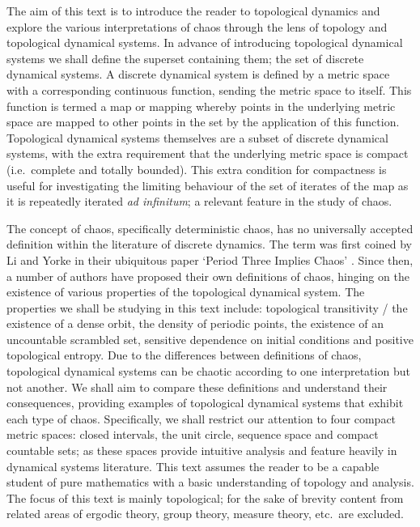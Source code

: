 The aim of this text is to introduce the reader to topological dynamics and explore the various interpretations of chaos through the lens of topology and topological dynamical systems. In advance of introducing topological dynamical systems we shall define the superset containing them; the set of discrete dynamical systems. A discrete dynamical system is defined by a metric space with a corresponding continuous function, sending the metric space to itself. This function is termed a map or mapping whereby points in the underlying metric space are mapped to other points in the set by the application of this function. Topological dynamical systems themselves are a subset of discrete dynamical systems, with the extra requirement that the underlying metric space is compact (i.e.\ complete and totally bounded). This extra condition for compactness is useful for investigating the limiting behaviour of the set of iterates of the map as it is repeatedly iterated \emph{ad infinitum}; a relevant feature in the study of chaos.

The concept of chaos, specifically deterministic chaos, has no universally accepted definition within the literature of discrete dynamics. The term was first coined by Li and Yorke in their ubiquitous paper `Period Three Implies Chaos' \cite{li-yorke}. Since then, a number of authors have proposed their own definitions of chaos, hinging on the existence of various properties of the topological dynamical system. The properties we shall be studying in this text include: topological transitivity / the existence of a dense orbit, the density of periodic points, the existence of an uncountable scrambled set, sensitive dependence on initial conditions and positive topological entropy. Due to the differences between definitions of chaos, topological dynamical systems can be chaotic according to one interpretation but not another. We shall aim to compare these definitions and understand their consequences, providing examples of topological dynamical systems that exhibit each type of chaos. Specifically, we shall restrict our attention to four compact metric spaces: closed intervals, the unit circle, sequence space and compact countable sets; as these spaces provide intuitive analysis and feature heavily in dynamical systems literature. This text assumes the reader to be a capable student of pure mathematics with a basic understanding of topology and analysis. The focus of this text is mainly topological; for the sake of brevity content from related areas of ergodic theory, group theory, measure theory, etc.\ are excluded.

